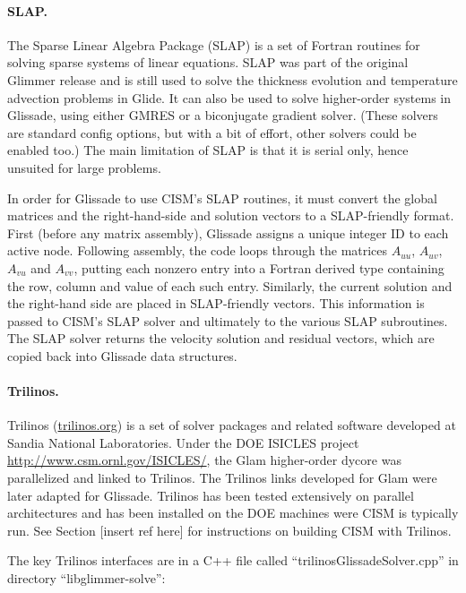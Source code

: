 \paragraph{SLAP.}

The Sparse Linear Algebra Package (SLAP) is a set of Fortran routines for solving sparse systems of linear
equations. SLAP was part of the original Glimmer release and is still used to solve the thickness evolution
and temperature advection problems in Glide.  It can also be used to solve higher-order systems in Glissade,
using either GMRES or a biconjugate gradient solver. (These solvers are standard config options, but with a bit of
effort, other solvers could be enabled too.)  The main limitation of SLAP is that it is serial only,
hence unsuited for large problems.

In order for Glissade to use CISM's SLAP routines, it must convert the global matrices and the 
right-hand-side and solution vectors to a SLAP-friendly format. First (before any matrix assembly),
Glissade assigns a unique integer ID to each active node.  Following assembly, the code loops through the matrices
$A_{uu}$, $A_{uv}$, $A_{vu}$ and $A_{vv}$, putting each nonzero entry into a Fortran derived type containing
the row, column and value of each such entry.  Similarly, the current solution and the right-hand side are placed
in SLAP-friendly vectors. This information is passed to CISM's SLAP solver
and ultimately to the various SLAP subroutines.  The SLAP solver returns the velocity solution
and residual vectors, which are copied back into Glissade data structures.

\paragraph{Trilinos.}

Trilinos (\url{trilinos.org}) is a set of solver packages and related software developed at 
Sandia National Laboratories. Under the DOE ISICLES project \url{http://www.csm.ornl.gov/ISICLES/},
the Glam higher-order dycore was parallelized and linked to Trilinos.  The Trilinos links
developed for Glam were later adapted for Glissade.  Trilinos has been tested extensively on
parallel architectures and has been installed on the DOE machines were CISM is typically run.
See Section [insert ref here] for instructions on building CISM with Trilinos.

The key Trilinos interfaces are in a C++ file called ``trilinosGlissadeSolver.cpp'' in directory ``libglimmer-solve'':

